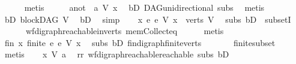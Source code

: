 \begin{isabellebody}
\ \ \ \ \isamarkupfalse%
\ metis\isanewline
\ \ \isamarkupfalse%
\ \isamarkupfalse%
\ a{\isacharunderscore}{\kern0pt}not{\isacharcolon}{\kern0pt}\ {\isachardoublequoteopen}{\isasymnot}\ a\ {\isasymrightarrow}\isactrlsup {\isacharasterisk}{\kern0pt}\isactrlbsub V\isactrlesub \ x{\isachardoublequoteclose}\ \isamarkupfalse%
\ bD\ DAG{\isachardot}{\kern0pt}unidirectional\ subs\ \isamarkupfalse%
\ metis\isanewline
\ \ \isamarkupfalse%
\ bD{}{\isacharcolon}{\kern0pt}\ {\isachardoublequoteopen}blockDAG\ V{\isachardoublequoteclose}\ \isamarkupfalse%
\ bD\ \isamarkupfalse%
\ simp\isanewline
\ \ \isamarkupfalse%
\ {\isachardoublequoteopen}{\isasymforall}x{\isachardot}{\kern0pt}\ {\isacharbraceleft}{\kern0pt}e{\isachardot}{\kern0pt}\ e\ {\isasymrightarrow}\isactrlsup {\isacharasterisk}{\kern0pt}\isactrlbsub V\isactrlesub \ x{\isacharbraceright}{\kern0pt}\ {\isasymsubseteq}\ verts\ V{\isachardoublequoteclose}\ \isamarkupfalse%
\ subs\ bD{}\ \ subsetI\isanewline
\ \ \ \ \ \ wf{\isacharunderscore}{\kern0pt}digraph{\isachardot}{\kern0pt}reachable{\isacharunderscore}{\kern0pt}in{\isacharunderscore}{\kern0pt}verts{\isacharparenleft}{\kern0pt}{}{\isacharparenright}{\kern0pt}\ mem{\isacharunderscore}{\kern0pt}Collect{\isacharunderscore}{\kern0pt}eq\isanewline
\ \ \ \ \isamarkupfalse%
\ metis\ \isanewline
\ \ \isamarkupfalse%
\ \isamarkupfalse%
\ fin{\isacharcolon}{\kern0pt}\ {\isachardoublequoteopen}{\isasymforall}x{\isachardot}{\kern0pt}\ finite\ {\isacharbraceleft}{\kern0pt}e{\isachardot}{\kern0pt}\ e\ {\isasymrightarrow}\isactrlsup {\isacharasterisk}{\kern0pt}\isactrlbsub V\isactrlesub \ x{\isacharbraceright}{\kern0pt}{\isachardoublequoteclose}\ \isamarkupfalse%
\ subs\ bD{}\ fin{\isacharunderscore}{\kern0pt}digraph{\isachardot}{\kern0pt}finite{\isacharunderscore}{\kern0pt}verts\ \isanewline
\ \ \ \ \ \ finite{\isacharunderscore}{\kern0pt}subset\isanewline
\ \ \ \ \isamarkupfalse%
\ metis\isanewline
\ \ \isamarkupfalse%
\ {\isachardoublequoteopen}x\ {\isasymrightarrow}\isactrlsup {\isacharasterisk}{\kern0pt}\isactrlbsub V\isactrlesub \ a{\isachardoublequoteclose}\ \isamarkupfalse%
\ rr\ wf{\isacharunderscore}{\kern0pt}digraph{\isachardot}{\kern0pt}reachable{}{\isacharunderscore}{\kern0pt}reachable\ subs\ bD{}\ \isamarkupfalse%

\end{isabellebody}
